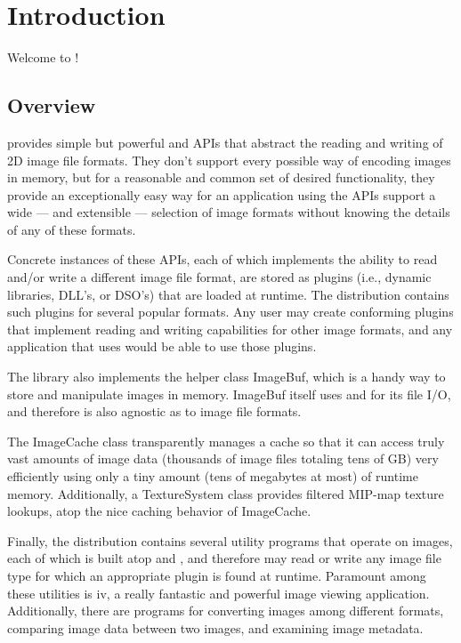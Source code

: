 \chapter{Introduction}
\label{chap:oiiointro}



Welcome to \product!

\bigskip

\section{Overview}

\product provides simple but powerful \ImageInput and \ImageOutput APIs
that abstract the reading and writing of 2D image file formats.  They
don't support every possible way of encoding images in memory, but for a
reasonable and common set of desired functionality, they provide an
exceptionally easy way for an application using the APIs support a wide
--- and extensible --- selection of image formats without knowing the
details of any of these formats.

Concrete instances of these APIs, each of which implements the ability
to read and/or write a different image file format, are stored as
plugins (i.e., dynamic libraries, DLL's, or DSO's) that are loaded at
runtime.  The \product distribution contains such plugins for several
popular formats.  Any user may create conforming plugins that implement
reading and writing capabilities for other image formats, and any
application that uses \product would be able to use those plugins.

The library also implements the helper class {\kw ImageBuf}, which is a
handy way to store and manipulate images in memory.  {\kw ImageBuf}
itself uses \ImageInput and \ImageOutput for its file I/O, and therefore
is also agnostic as to image file formats.

The {\kw ImageCache} class transparently manages a cache so that it can
access truly vast amounts of image data (thousands of image files
totaling tens of GB) very efficiently using only a tiny amount (tens of
megabytes at most) of runtime memory.  Additionally, a {\kw
  TextureSystem} class provides filtered MIP-map texture lookups, atop
the nice caching behavior of {\kw ImageCache}.

Finally, the \product distribution contains several utility programs
that operate on images, each of which is built atop \ImageInput and
\ImageOutput, and therefore may read or write any image file type for
which an appropriate plugin is found at runtime.  Paramount among these
utilities is {\fn iv}, a really fantastic and powerful image viewing
application.  Additionally, there are programs for converting images
among different formats, comparing image data between two images, 
and examining image metadata.


